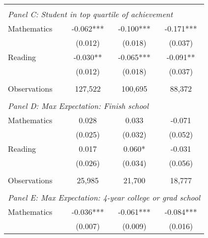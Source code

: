 {\begin{tabular}{lccc}
&  &  &   \\
\multicolumn{4}{l}{\textit{Panel C: Student in top quartile of achievement}} \\
\hspace{3mm}Mathematics&      -0.062***&      -0.100***&      -0.171***\\
                    &     (0.012)   &     (0.018)   &     (0.037)   \\
 
\hspace{3mm}Reading &      -0.030** &      -0.065***&      -0.091** \\
                    &     (0.012)   &     (0.018)   &     (0.037)   \\
                    &               &               &               \\
\hspace{3mm}Observations&     127,522   &     100,695   &      88,372   \\
 
&  &  &   \\
\multicolumn{4}{l}{\textit{Panel D: Max Expectation: Finish school}} \\
\hspace{3mm}Mathematics&       0.028   &       0.033   &      -0.071   \\
                    &     (0.025)   &     (0.032)   &     (0.052)   \\
 
\hspace{3mm}Reading &       0.017   &       0.060*  &      -0.031   \\
                    &     (0.026)   &     (0.034)   &     (0.056)   \\
                    &               &               &               \\
\hspace{3mm}Observations&      25,985   &      21,700   &      18,777   \\
 
&  &  &   \\
\multicolumn{4}{l}{\textit{Panel E: Max Expectation: 4-year college or grad school}} \\
\hspace{3mm}Mathematics&      -0.036***&      -0.061***&      -0.084***\\
                    &     (0.007)   &     (0.009)   &     (0.016)   \\
 

\end{tabular}}
